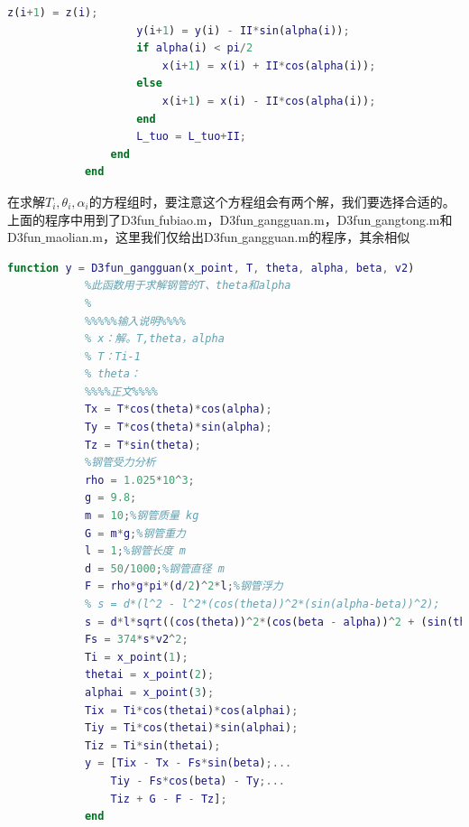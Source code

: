 \begin{lstlisting}[language = Matlab]
                    z(i+1) = z(i);
                    y(i+1) = y(i) - II*sin(alpha(i));
                    if alpha(i) < pi/2
                        x(i+1) = x(i) + II*cos(alpha(i));
                    else
                        x(i+1) = x(i) - II*cos(alpha(i));
                    end
                    L_tuo = L_tuo+II;
                end
            end
            \end{lstlisting}
            \par
            在求解$T_i,\theta_i,\alpha_i$的方程组时，要注意这个方程组会有两个解，我们要选择合适的。上面的程序中用到了D3fun$\_$fubiao.m，D3fun$\_$gangguan.m，D3fun$\_$gangtong.m和D3fun$\_$maolian.m，这里我们仅给出D3fun$\_$gangguan.m的程序，其余相似
            \begin{lstlisting}[language = Matlab]
            function y = D3fun_gangguan(x_point, T, theta, alpha, beta, v2)
            %此函数用于求解钢管的T、theta和alpha
            %
            %%%%%输入说明%%%%
            % x：解。T,theta，alpha
            % T：Ti-1
            % theta：
            %%%%正文%%%%
            Tx = T*cos(theta)*cos(alpha);
            Ty = T*cos(theta)*sin(alpha);
            Tz = T*sin(theta);
            %钢管受力分析
            rho = 1.025*10^3;
            g = 9.8;
            m = 10;%钢管质量 kg
            G = m*g;%钢管重力
            l = 1;%钢管长度 m
            d = 50/1000;%钢管直径 m
            F = rho*g*pi*(d/2)^2*l;%钢管浮力
            % s = d*(l^2 - l^2*(cos(theta))^2*(sin(alpha-beta))^2);
            s = d*l*sqrt((cos(theta))^2*(cos(beta - alpha))^2 + (sin(theta))^2);
            Fs = 374*s*v2^2;
            Ti = x_point(1);
            thetai = x_point(2);
            alphai = x_point(3);
            Tix = Ti*cos(thetai)*cos(alphai);
            Tiy = Ti*cos(thetai)*sin(alphai);
            Tiz = Ti*sin(thetai);
            y = [Tix - Tx - Fs*sin(beta);...
                Tiy - Fs*cos(beta) - Ty;...
                Tiz + G - F - Tz];
            end
            \end{lstlisting}

